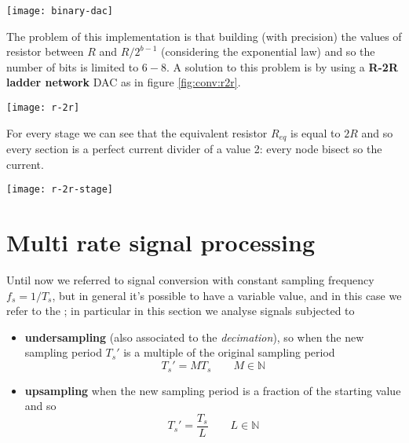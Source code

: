 		\begin{SCfigure}[2][bht]
			\centering \texttt{[image: binary-dac]}
			\caption{general implementation of a binary-weighted voltage digital to analog converters.}
		\end{SCfigure}
		
		The problem of this implementation is that building (with precision) the values of resistor between $R$ and $R/2^{b-1}$ (considering the exponential law) and so the number of bits is limited to $6-8$.		A solution to this problem is by using a \textbf{R-2R ladder network} DAC as in figure \ref{fig:conv:r2r}.
		
		\begin{SCfigure}[1][bht]
			\centering \texttt{[image: r-2r]}
			\caption{implementation of a R-2R ladder network digital to analog converter.}
			\label{fig:conv:r2r}
		\end{SCfigure}
		
		For every stage we can see that the equivalent resistor $R_{eq}$ is equal to $2R$ and so every section is a perfect current divider of a value 2: every node bisect so the current.
		
		\begin{SCfigure}[2][bht]
			\centering \texttt{[image: r-2r-stage]}
			\caption{$i$-th stage of the R-2R ladder network DAC.}
		\end{SCfigure}

\section{Multi rate signal processing}
	Until now we referred to signal conversion with constant sampling frequency $f_s = 1/T_s$, but in general it's possible to have a variable value, and in this case we refer to the ; in particular in this section we analyse signals subjected to
	\begin{itemize}
		\item \textbf{undersampling} (also associated to the \textit{decimation}), so when the new sampling period $T_s'$ is a multiple of the original sampling period
		\[ T_s' = M T_s\qquad M\in\mathds N \]
		\item \textbf{upsampling} when the new sampling period is a fraction of the starting value and so
		\[ T_s' = \frac{T_s}{L} \qquad L \in \mathds N \]
	\end{itemize}
	
